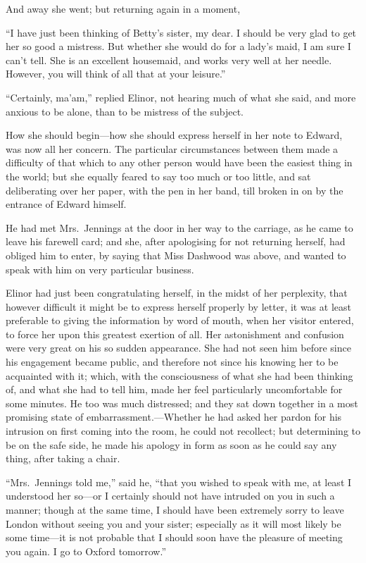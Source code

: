 And away she went; but returning again in a moment,

``I have just been thinking of Betty's sister, my dear.
I should be very glad to get her so good a mistress.
But whether she would do for a lady's maid, I am sure I
can't tell.  She is an excellent housemaid, and works
very well at her needle.  However, you will think of all
that at your leisure.''

``Certainly, ma'am,'' replied Elinor, not hearing
much of what she said, and more anxious to be alone,
than to be mistress of the subject.

How she should begin---how she should express
herself in her note to Edward, was now all her concern.
The particular circumstances between them made
a difficulty of that which to any other person would
have been the easiest thing in the world; but she
equally feared to say too much or too little, and sat
deliberating over her paper, with the pen in her band,
till broken in on by the entrance of Edward himself.

He had met Mrs.\ Jennings at the door in her way to
the carriage, as he came to leave his farewell card; and she,
after apologising for not returning herself, had obliged
him to enter, by saying that Miss Dashwood was above,
and wanted to speak with him on very particular business.

Elinor had just been congratulating herself,
in the midst of her perplexity, that however difficult it
might be to express herself properly by letter, it was
at least preferable to giving the information by word
of mouth, when her visitor entered, to force her upon this
greatest exertion of all.  Her astonishment and confusion
were very great on his so sudden appearance.  She had
not seen him before since his engagement became public,
and therefore not since his knowing her to be acquainted
with it; which, with the consciousness of what she
had been thinking of, and what she had to tell him,
made her feel particularly uncomfortable for some minutes.
He too was much distressed; and they sat down together
in a most promising state of embarrassment.---Whether he
had asked her pardon for his intrusion on first coming
into the room, he could not recollect; but determining
to be on the safe side, he made his apology in form
as soon as he could say any thing, after taking a chair.

``Mrs.\ Jennings told me,'' said he, ``that you wished
to speak with me, at least I understood her so---or I
certainly should not have intruded on you in such a manner;
though at the same time, I should have been extremely
sorry to leave London without seeing you and your sister;
especially as it will most likely be some time---it
is not probable that I should soon have the pleasure
of meeting you again.  I go to Oxford tomorrow.''

